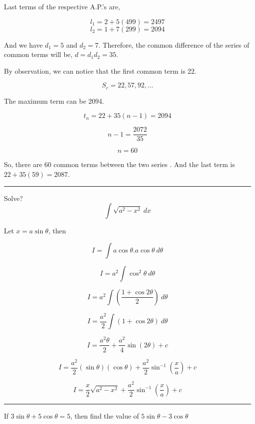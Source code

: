 \documentclass[twocolumn]{article}
\begin{document}
\begin{CJK*}{UTF8}{gbsn}
Last terms of the respective A.P.'s are, 

\[
    l_1 = 2 + 5(499) = 2497
\]
\[
    l_2 = 1 + 7(299) = 2094
\]


And we have \(d_1 = 5\) and \(d_2 = 7\). Therefore, the common difference of the series of common terms will be, \(d = d_1 d_2 = 35\). 

\vspace*{0.1in}

By observation, we can notice that the first common term is 22. 

\[
    S_c = 22 , 57, 92, \dots 
\]

The maximum term can be 2094.

\[
    t_{n} = 22 + 35(n-1) = 2094
\]

\[
    n-1 = \frac{2072}{35}
\]

\[
    n = 60
\]

So, there are 60 common terms between the two series . And the last term is \(22 + 35 (59) = \boxed{2087}\).

\vspace*{0.1in}

\hrule

\begin{question}
    Solve?
    \[
        \int \sqrt{a^{2} - x^{2} }\ dx
    \]
\end{question}

Let \(x = a\sin \theta \), then 

\[
    I = \int a \cos \theta. a\cos \theta \ d \theta 
\]

\[
    I = a^{2} \int \cos ^{2}  \theta \ d \theta 
\]

\[
    I = a^{2} \int  (\frac{ 1 + \cos 2\theta }{2})\ d \theta 
\]

\[
    I = \frac{a^{2}}{2} \int (1 + \cos 2 \theta )\ d \theta 
\]

\[
    I = \frac{a^{2} \theta }{2} + \frac{a^{2}}{4}\sin (2 \theta ) + c
\]

\[
    I = \frac{a^{2}}{2}(\sin \theta)(\cos \theta ) + \frac{a^{2}}{2}\sin^{-1} (\frac{x}{a}) + c 
\]

\[
    \boxed{I = \frac{x}{2}\sqrt{a^{2} -x^{2}} + \frac{a^{2}}{2} \sin^{-1} (\frac{x}{a}) + c}
\]

\hrule 

\begin{question}
    If \(3 \sin \theta + 5 \cos  \theta = 5\), then find the value of \(5\sin \theta  - 3\cos \theta\)  
\end{question}


\end{CJK*}
\end{document}
